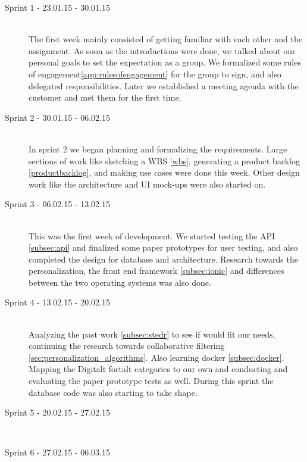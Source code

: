 \begin{description}
	
	\item[Sprint 1 - 23.01.15 - 30.01.15] \hfill \\ 
	The first week mainly consisted of getting familiar with each other and the assignment. As soon as the introductions were done, we talked about our personal goals to set the expectation as a group. We formalized some rules of engagement\ref{app:rulesofengagement} for the group to sign, and also delegated responsibilities. Later we established a meeting agenda with the customer and met them for the first time.
	
	\item[Sprint 2 - 30.01.15 - 06.02.15] \hfill \\ 
	In sprint 2 we began planning and formalizing the requirements. Large sections of work like sketching a WBS \ref{wbs}, generating a product backlog \ref{productbacklog}, and making use cases were done this week. Other design work like the architecture and UI mock-ups were also started on.
	
	\item[Sprint 3 - 06.02.15 - 13.02.15] \hfill \\ 
	This was the first week of development. We started testing the API \ref{subsec:api} and finalized some paper prototypes for user testing,  and also completed the design for database and architecture. Research towards the personalization, the front end framework \ref{subsec:ionic}  and differences between the two operating systems  was also done. 
	
	\item[Sprint 4 - 13.02.15 - 20.02.15] \hfill \\ 
	Analyzing the past work \ref{subsec:stedr} to see if would fit our needs, continuing the research towards collaborative filtering \ref{sec:personalization_algorithms}. Also learning docker \ref{subsec:docker}. Mapping the Digitalt fortalt  categories to our own and conducting and evaluating the paper prototype tests as well. During this sprint the database code was also starting to take shape.
	
	\item[Sprint 5 - 20.02.15 - 27.02.15] \hfill \\ 
	
		
	\item[Sprint 6 - 27.02.15 - 06.03.15] \hfill \\ 


\end{description}
